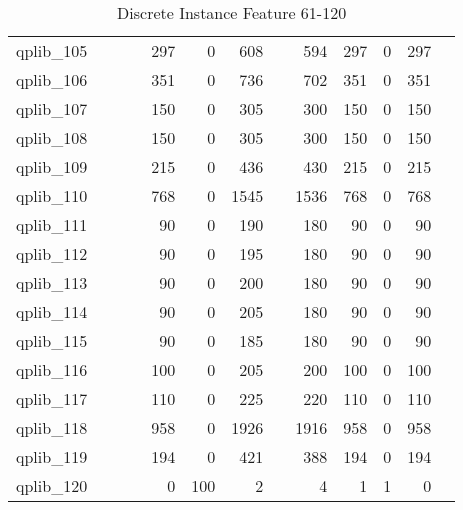 \begin{table}
\begin{tabular}{lrrrrrrrrrrrr}
qplib\_105	&		&		&	&	297	&	0	&	608	&	&	594	&	297	&	0	&	297	\\
qplib\_106	&		&		&	&	351	&	0	&	736	&	&	702	&	351	&	0	&	351	\\
qplib\_107	&		&		&	&	150	&	0	&	305	&	&	300	&	150	&	0	&	150	\\
qplib\_108	&		&		&	&	150	&	0	&	305	&	&	300	&	150	&	0	&	150	\\
qplib\_109	&		&		&	&	215	&	0	&	436	&	&	430	&	215	&	0	&	215	\\
qplib\_110	&		&		&	&	768	&	0	&	1545	&	&	1536	&	768	&	0	&	768	\\
qplib\_111	&		&		&	&	90	&	0	&	190	&	&	180	&	90	&	0	&	90	\\
qplib\_112	&		&		&	&	90	&	0	&	195	&	&	180	&	90	&	0	&	90	\\
qplib\_113	&		&		&	&	90	&	0	&	200	&	&	180	&	90	&	0	&	90	\\
qplib\_114	&		&		&	&	90	&	0	&	205	&	&	180	&	90	&	0	&	90	\\
qplib\_115	&		&		&	&	90	&	0	&	185	&	&	180	&	90	&	0	&	90	\\
qplib\_116	&		&		&	&	100	&	0	&	205	&	&	200	&	100	&	0	&	100	\\
qplib\_117	&		&		&	&	110	&	0	&	225	&	&	220	&	110	&	0	&	110	\\
qplib\_118	&		&		&	&	958	&	0	&	1926	&	&	1916	&	958	&	0	&	958	\\
qplib\_119	&		&		&	&	194	&	0	&	421	&	&	388	&	194	&	0	&	194	\\
qplib\_120	&		&		&	&	0	&	100	&	2	&	&	4	&	1	&	1	&	0	\\

		
		
		
\bottomrule

\end{tabular}  
\label{tab:A2}
\caption{Discrete Instance Feature 61-120} 

\end{table}
